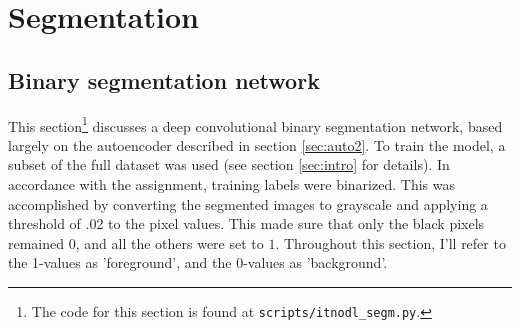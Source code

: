 

\section{Segmentation}
\label{sec:segm}





\subsection{Binary segmentation network}
\label{sec:segm_1}

This section\footnote{The code for this section is found at \texttt{scripts/itnodl\_segm.py}.
} discusses a deep convolutional binary segmentation network, based largely on the autoencoder described in section \textcolor{blue}{\ref{sec:auto2}}. To train the model, a subset of the full dataset was used (see section \textcolor{blue}{\ref{sec:intro}} for details). In accordance with the assignment, training labels were binarized. This was accomplished by converting the segmented images to grayscale and applying a threshold of .02 to the pixel values. This made sure that only the black pixels remained $0$, and all the others were set to $1$. Throughout this section, I'll refer to the 1-values as 'foreground', and the 0-values as 'background'.

